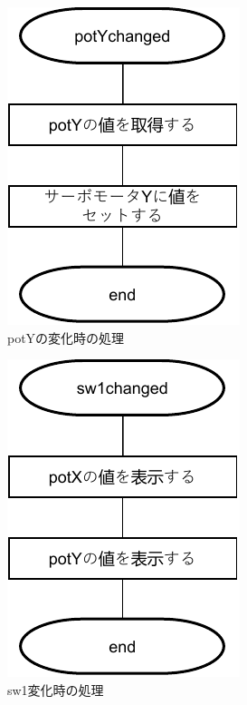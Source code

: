 \documentclass{jarticle}
\begin{document}
\begin{figure}[H]
    \centering
    \includegraphics{kadai5setDrawArea-potY.pdf}
    \caption{potYの変化時の処理}
    \label{fig:my_label}
\end{figure}

\begin{figure}[H]
    \centering
    \includegraphics{kadai5setDrawArea-sw1.pdf}
    \caption{sw1変化時の処理}
    \label{fig:my_label}
\end{figure}
\end{document}
